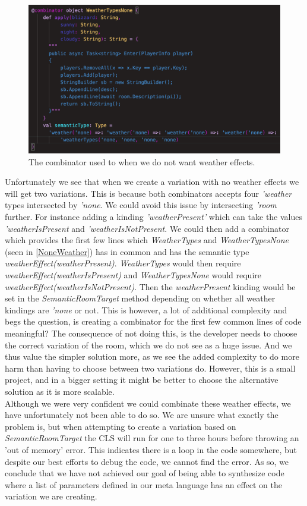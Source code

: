 \begin{figure}[H]
	\centering
	\includegraphics[width=\linewidth]{Materials/Decomposition/Room/NoneWeather}
	\caption{The combinator used to when we do not want weather effects.}
	\label{NoneWeather}
\end{figure}
Unfortunately we see that when we create a variation with no weather effects we will get two variations. This is because both combinators accepts four \textit{'weather} types intersected by \textit{'none}. We could avoid this issue by intersecting \textit{'room} further. For instance adding a kinding \textit{'weatherPresent'} which can take the values \textit{'weatherIsPresent} and \textit{'weatherIsNotPresent}. We could then add a combinator which provides the first few lines which \textit{WeatherTypes} and \textit{WeatherTypesNone} (seen in \autoref{NoneWeather}) has in common and has the semantic type \textit{weatherEffect(weatherPresent)}. \textit{WeatherTypes} would then require \textit{weatherEffect(weatherIsPresent)} and \textit{WeatherTypesNone} would require \textit{weatherEffect(weatherIsNotPresent)}. Then the \textit{weatherPresent} kinding would be set in the \textit{SemanticRoomTarget} method depending on whether all weather kindings are \textit{'none} or not. This is however, a lot of additional complexity and begs the question, is creating a combinator for the first few common lines of code meaningful? The consequence of not doing this, is the developer needs to choose the correct variation of the room, which we do not see as a huge issue. And we thus value the simpler solution more, as we see the added complexity to do more harm than having to choose between two variations do. However, this is a small project, and in a bigger setting it might be better to choose the alternative solution as it is more scalable.\\

Although we were very confident we could combinate these weather effects, we have unfortunately not been able to do so. We are unsure what exactly the problem is, but when attempting to create a variation based on \textit{SemanticRoomTarget} the CLS will run for one to three hours before throwing an 'out of memory' error. This indicates there is a loop in the code somewhere, but despite our best efforts to debug the code, we cannot find the error. As so, we conclude that we have not achieved our goal of being able to synthesize code where a list of parameters defined in our meta language has an effect on the variation we are creating.

